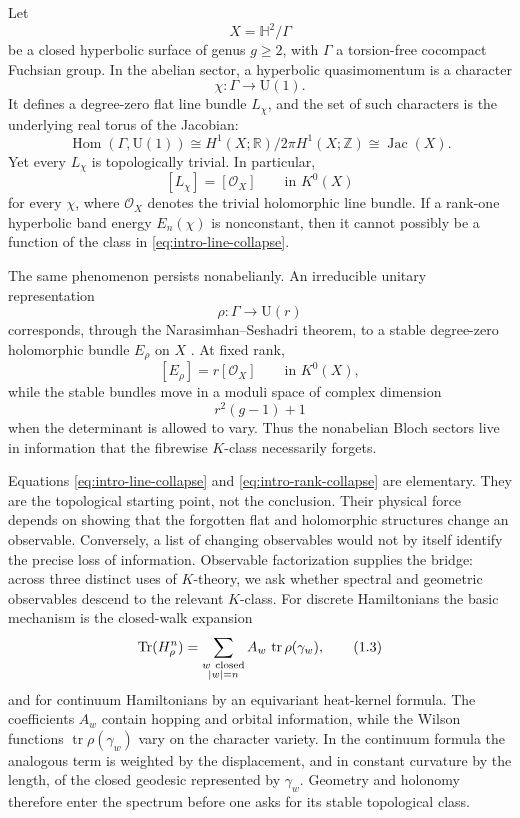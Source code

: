 \documentclass[11pt]{article}
\theoremstyle{definition}
\theoremstyle{remark}
\newcommand{\HH}{\mathbb H}
\newcommand{\RR}{\mathbb R}
\newcommand{\ZZ}{\mathbb Z}
\newcommand{\UU}{\mathrm U}
\newcommand{\Jac}{\operatorname{Jac}}
\newcommand{\Hom}{\operatorname{Hom}}
\newcommand{\Tr}{\operatorname{Tr}}
\newcommand{\tr}{\operatorname{tr}}
\newcommand{\cO}{\mathcal O}
\begin{document}
Let
\[
    X=\HH^2/\Gamma
\]
be a closed hyperbolic surface of genus \(g\geq 2\), with \(\Gamma\) a
torsion-free cocompact Fuchsian group.  In the abelian sector, a hyperbolic
quasimomentum is a character
\[
   \chi:\Gamma\longrightarrow \UU(1).
\]
It defines a degree-zero flat line bundle \(L_\chi\), and the set of such
characters is the underlying real torus of the Jacobian:
\[
   \Hom(\Gamma,\UU(1))
   \cong H^1(X;\RR)/2\pi H^1(X;\ZZ)
   \cong \Jac(X).
\]
Yet every \(L_\chi\) is topologically trivial.  In particular,
\[
             [L_\chi]=[\cO_X]\qquad\text{in }K^0(X)
             \tag{1.1}\label{eq:intro-line-collapse}
\]
for every \(\chi\), where \(\cO_X\) denotes the trivial holomorphic line
bundle.  If a rank-one hyperbolic band energy
\(E_n(\chi)\) is nonconstant, then it cannot possibly be a function of the
class in \eqref{eq:intro-line-collapse}.

The same phenomenon persists nonabelianly.  An irreducible unitary
representation
\[
       \rho:\Gamma\longrightarrow \UU(r)
\]
corresponds, through the Narasimhan--Seshadri theorem, to a stable
degree-zero holomorphic bundle \(E_\rho\) on \(X\)
\cite{NarasimhanSeshadri,DonaldsonNS}.  At fixed rank,
\[
        [E_\rho]=r[\cO_X]\qquad\text{in }K^0(X),
        \tag{1.2}\label{eq:intro-rank-collapse}
\]
while the stable bundles move in a moduli space of complex dimension
\[
                  r^2(g-1)+1
\]
when the determinant is allowed to vary.  Thus the nonabelian Bloch sectors
live in information that the fibrewise \(K\)-class necessarily forgets.

Equations \eqref{eq:intro-line-collapse} and
\eqref{eq:intro-rank-collapse} are elementary.  They are the topological
starting point, not the conclusion.  Their physical force depends on showing
that the forgotten flat and holomorphic structures change an observable.
Conversely, a list of changing observables would not by itself identify the
precise loss of information.  Observable factorization supplies the bridge:
across three distinct uses of \(K\)-theory, we ask whether spectral and
geometric observables descend to the relevant \(K\)-class.  For discrete
Hamiltonians the basic mechanism is the closed-walk expansion
\[
   \Tr(H_\rho^n)
      =\sum_{\substack{w\ {\rm closed}\\ |w|=n}}
          A_w\,\tr\rho(\gamma_w),
          \tag{1.3}\label{eq:intro-wilson}
\]
and for continuum Hamiltonians by an equivariant heat-kernel formula.  The
coefficients \(A_w\) contain hopping and orbital information, while the Wilson
functions \(\tr\rho(\gamma_w)\) vary on the character variety.  In the
continuum formula the analogous term is weighted by the displacement, and in
constant curvature by the length, of the closed geodesic represented by
\(\gamma_w\).  Geometry and holonomy therefore enter the spectrum before one
asks for its stable topological class.
\end{document}
